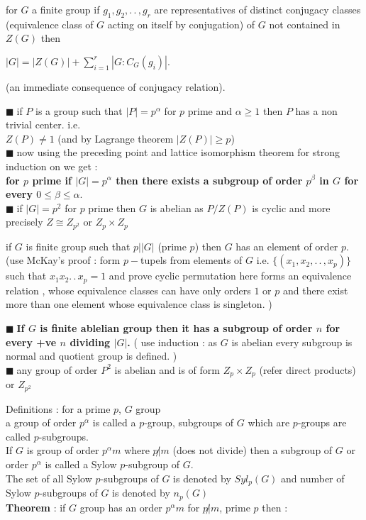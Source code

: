 \documentclass[11pt]{extarticle}
\newcommand{\ck}{.\,.\,}
\newcommand{\sm}[2]{\displaystyle\sum_{#1}^{#2}}
\newcommand{\snote}[1]{{\footnotesize(#1)}}
\newcommand{\y}{$\blacksquare\;$}
\newcommand{\tbx}[2][]{
	\begin{tcolorbox}[enhanced,breakable,size=small,colback=black!2!white,title={#1},arc is angular, arc=1.5mm,drop fuzzy shadow]
		#2
	\end{tcolorbox}
}
\begin{document}
\begin{multicols}{2}
	\tbx[\textbf{The Class Equation} ]{for $ G $ a finite group if $ g_1,g_2,\ck , g_r $ are representatives of distinct conjugacy classes \snote{equivalence class of $ G $ acting on itself by conjugation} of $ G $ not contained in 
		$ Z(G) $ then 
		\begin{center}
			$  |G|=|Z(G)|+\sm{i=1}{r}|G:C_G(g_i)|.$
		\end{center} (an immediate consequence of conjugacy relation).
	}
	\tbx[Consequences of  Class equations :]{
		
			\y  if $ P $ is a group such that $ |P|=p^\alpha $ for $ p $ prime and $ \alpha \geq 1 $  then $ P $ has  
			a non trivial center. i.e. \\
			$ Z(P)\neq 1 $ (and by Lagrange theorem $ |Z(P) |\geq p $)\\
			\y  	now using the preceding point and lattice isomorphism theorem for strong induction on we get : \\ 
			\textbf{for $ p $ prime if $ |G|=p^\alpha $ then there exists a subgroup of order $ p^\beta $ in $ G $ for every
				$ 0\leq \beta \leq \alpha .$}\\
			\y  if $ |G|=p^2 $ for $ p $ prime then $ G $ is abelian as $ P/Z(P) $ is cyclic and more precisely  
			$ Z\cong Z_{p^2} $ or $ Z_p \times Z_p $
		
		
	}
	\tbx[\textbf{Cauchy's Theorem} ]{if $ G $ is finite group such that $ p| |G| $ (prime $ p $) then $ G $ has an element of order $ p .$\\
		{ \footnotesize (use McKay's proof  : form $ p- $tupels from elements of  $ G $ i.e. $ \{(x_1,x_2,\ck,x_p) \}$ such that $ x_1x_2\ck x_p =1 $  and prove cyclic permutation here forms an equivalence relation , whose equivalence classes can have only orders $ 1 $ or $ p $ and there exist more than one element whose equivalence class is singleton. )} 
	}
	\tbx[Consequences of Cauchy's  theorem ]{
		
			\y  \textbf{If $ G $ is finite ablelian group then it has a subgroup of order $ n $ for every +ve $ n $ dividing $ |G| $.} \snote{ use induction : as $ G $ is abelian every subgroup is normal and quotient group is defined. } \\
			\y  any group of order $ P^2 $ is abelian and is of form $ Z_p \times Z_p $ \snote{refer direct products} or $ Z_{p^2} $ 
		
		
	}
	\tbx[\textbf{SYLOW'S Theorem} ]{
		{ Definitions :  for a prime $ p $, $ G $ group\\
			a group of order $ p^\alpha $ is called a $p $-group, subgroups of $ G $ which are $ p $-groups are called 
			$ p $-subgroups.\\
			If $ G $ is group of order $ p^\alpha m $ where $ p \not| m $ (does not divide) then a subgroup of $ G $ or order $ p^\alpha $ is called a Sylow $ p $-subgroup of $ G. $\\
			The set of all Sylow $ p $-subgroups of $ G $ is denoted by $ Syl_p(G) $ and number of  Sylow $ p $-subgroups of $ G $ is denoted by $ n_p(G) $}\\
		\textbf{Theorem} : if $ G $ group has an order $ p^\alpha m $ for $ p\not| m $, prime $ p $ then :
		
}
\end{multicols}
\end{document}
